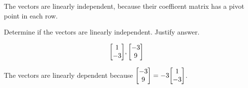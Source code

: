 \documentclass{../mathhomework}
\newenvironment{Mat}{\begin{bmatrix}}{\end{bmatrix}}
\begin{document}
\begin{problem}[1.7\#1]
\begin{solution}
        The vectors are linearly independent, because their coefficent matrix has a pivot point in each row.
    \end{solution}
\end{problem}

\newpage

\begin{problem}[1.7\#3]
    Determine if the vectors are linearly independent. Justify answer.
    
    \begin{equation*}
        \begin{Mat}
            1 \\ -3
        \end{Mat},
        \begin{Mat}
            -3 \\ 9
        \end{Mat}
    \end{equation*}

    \begin{solution}
        The vectors are linearly dependent because $\begin{Mat}-3 \\ 9\end{Mat} = -3\begin{Mat}1 \\ -3\end{Mat}$.
    \end{solution}
\end{problem}
\end{document}
